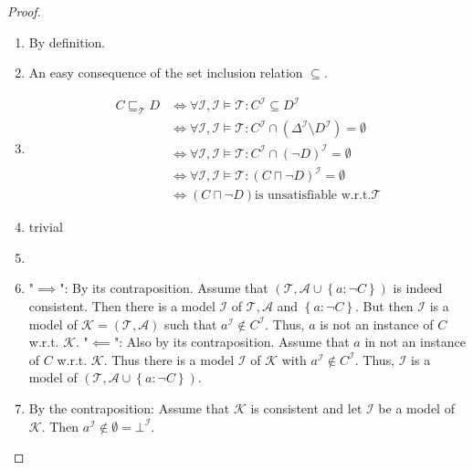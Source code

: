 \begin{proof}
	\begin{enumerate}
		\item By definition.
		\item An easy consequence of the set inclusion relation $\subseteq$.
		\item
			\begin{align*}
				C \sqsubseteq_{\mathcal{T}} D & \iff \forall \mathcal{I}, \mathcal{I} \vDash \mathcal{T}: C^{\mathcal{I}} \subseteq D^{\mathcal{I}}\\
											  & \iff \forall \mathcal{I}, \mathcal{I} \vDash \mathcal{T} : C^\mathcal{I} \cap (\Delta^{\mathcal{I}} \setminus D^{\mathcal{I}}) = \emptyset\\
											  & \iff \forall \mathcal{I}, \mathcal{I} \vDash \mathcal{T}: C^{\mathcal{I}} \cap (\neg D)^\mathcal{I} = \emptyset\\
											  & \iff \forall \mathcal{I}, \mathcal{I} \vDash \mathcal{T}: \left( C \sqcap \neg D \right)^\mathcal{I} = \emptyset\\
											  & \iff \left( C \sqcap \neg D \right) \text{is unsatisfiable w.r.t.} \mathcal{T} 
			\end{align*}
		\item trivial 
		\item
		\item "$ \implies$": By its contraposition. \newline
			Assume that $\left( \mathcal{T}, \mathcal{A} \cup \left\{a: \neg C \right\} \right)$ is indeed consistent.
			Then there is  a model $\mathcal{I}$ of $\mathcal{T} , \mathcal{A}$ and $\left\{ a: \neg C \right\}$.
			But then $\mathcal{I}$ is a model of $\mathcal{K} = \left( \mathcal{T}, \mathcal{A} \right)$ such that
			$a^{\mathcal{I}} \notin C^\mathcal{I}$.
			Thus, $a$ is not an instance of $C$ w.r.t. $\mathcal{K}$. \newline
			"$\impliedby$": Also by its contraposition. \newline
			Assume that $a$ in not an instance of $C$ w.r.t. $\mathcal{K}$.
			Thus there is a model $\mathcal{I}$ of $\mathcal{K}$ with $a^\mathcal{I} \notin C^\mathcal{I}$.
			Thus, $\mathcal{I}$ is a model of $\left( \mathcal{T}, \mathcal{A} \cup \left\{ a: \neg C \right\} \right)$.
		\item By the contraposition: \newline
			Assume that $\mathcal{K}$ is consistent and let $\mathcal{I}$ be a model of $\mathcal{K}$.
			Then $a^\mathcal{I} \notin \emptyset = \bot^\mathcal{I}$.

\end{enumerate}
\end{proof}
